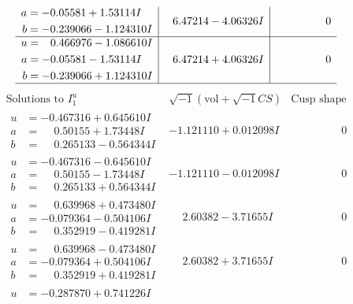 \documentclass[1p]{elsarticle_modified}
\theoremstyle{definition}
\newcommand{\I}{\sqrt{-1}}
\begin{document}
$$\begin{array}{c|c|c}
\begin{aligned}
a &= -0.05581 + 1.53114 I \\
b &= -0.239066 - 1.124310 I\end{aligned}
 & \phantom{-}6.47214 - 4.06326 I & \phantom{-0.000000 } 0 \\ \hline\begin{aligned}
u &= \phantom{-}0.466976 - 1.086610 I \\
a &= -0.05581 - 1.53114 I \\
b &= -0.239066 + 1.124310 I\end{aligned}
 & \phantom{-}6.47214 + 4.06326 I & \phantom{-0.000000 } 0\\
 \hline 
 \end{array}$$\newpage$$\begin{array}{c|c|c}  
\text{Solutions to }I^u_{1}& \I (\text{vol} + \sqrt{-1}CS) & \text{Cusp shape}\\
 \hline 
\begin{aligned}
u &= -0.467316 + 0.645610 I \\
a &= \phantom{-}0.50155 + 1.73448 I \\
b &= \phantom{-}0.265133 - 0.564344 I\end{aligned}
 & -1.121110 + 0.012098 I & \phantom{-0.000000 } 0 \\ \hline\begin{aligned}
u &= -0.467316 - 0.645610 I \\
a &= \phantom{-}0.50155 - 1.73448 I \\
b &= \phantom{-}0.265133 + 0.564344 I\end{aligned}
 & -1.121110 - 0.012098 I & \phantom{-0.000000 } 0 \\ \hline\begin{aligned}
u &= \phantom{-}0.639968 + 0.473480 I \\
a &= -0.079364 - 0.504106 I \\
b &= \phantom{-}0.352919 - 0.419281 I\end{aligned}
 & \phantom{-}2.60382 - 3.71655 I & \phantom{-0.000000 } 0 \\ \hline\begin{aligned}
u &= \phantom{-}0.639968 - 0.473480 I \\
a &= -0.079364 + 0.504106 I \\
b &= \phantom{-}0.352919 + 0.419281 I\end{aligned}
 & \phantom{-}2.60382 + 3.71655 I & \phantom{-0.000000 } 0 \\ \hline\begin{aligned}
u &= -0.287870 + 0.741226 I \\

\end{aligned}
\end{array}$$
\end{document}
